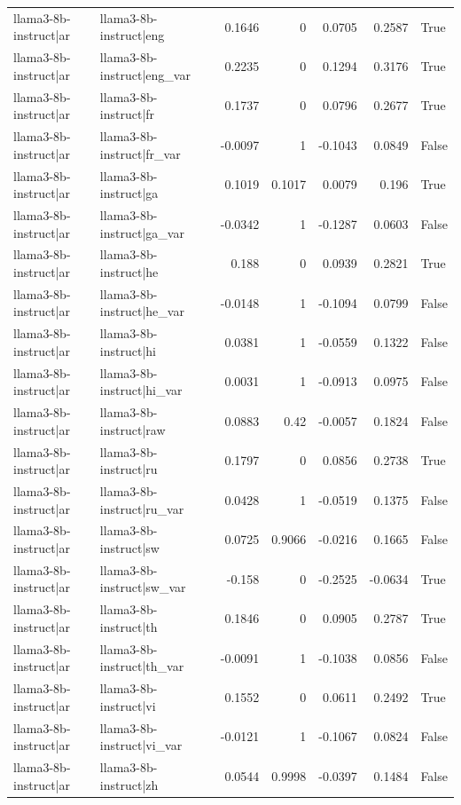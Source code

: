 \begin{table}
\begin{tabular}{l l r r r r l}
llama3-8b-instruct|ar & llama3-8b-instruct|eng & 0.1646 & 0 & 0.0705 & 0.2587 & True \\
llama3-8b-instruct|ar & llama3-8b-instruct|eng_var & 0.2235 & 0 & 0.1294 & 0.3176 & True \\
llama3-8b-instruct|ar & llama3-8b-instruct|fr & 0.1737 & 0 & 0.0796 & 0.2677 & True \\
llama3-8b-instruct|ar & llama3-8b-instruct|fr_var & -0.0097 & 1 & -0.1043 & 0.0849 & False \\
llama3-8b-instruct|ar & llama3-8b-instruct|ga & 0.1019 & 0.1017 & 0.0079 & 0.196 & True \\
llama3-8b-instruct|ar & llama3-8b-instruct|ga_var & -0.0342 & 1 & -0.1287 & 0.0603 & False \\
llama3-8b-instruct|ar & llama3-8b-instruct|he & 0.188 & 0 & 0.0939 & 0.2821 & True \\
llama3-8b-instruct|ar & llama3-8b-instruct|he_var & -0.0148 & 1 & -0.1094 & 0.0799 & False \\
llama3-8b-instruct|ar & llama3-8b-instruct|hi & 0.0381 & 1 & -0.0559 & 0.1322 & False \\
llama3-8b-instruct|ar & llama3-8b-instruct|hi_var & 0.0031 & 1 & -0.0913 & 0.0975 & False \\
llama3-8b-instruct|ar & llama3-8b-instruct|raw & 0.0883 & 0.42 & -0.0057 & 0.1824 & False \\
llama3-8b-instruct|ar & llama3-8b-instruct|ru & 0.1797 & 0 & 0.0856 & 0.2738 & True \\
llama3-8b-instruct|ar & llama3-8b-instruct|ru_var & 0.0428 & 1 & -0.0519 & 0.1375 & False \\
llama3-8b-instruct|ar & llama3-8b-instruct|sw & 0.0725 & 0.9066 & -0.0216 & 0.1665 & False \\
llama3-8b-instruct|ar & llama3-8b-instruct|sw_var & -0.158 & 0 & -0.2525 & -0.0634 & True \\
llama3-8b-instruct|ar & llama3-8b-instruct|th & 0.1846 & 0 & 0.0905 & 0.2787 & True \\
llama3-8b-instruct|ar & llama3-8b-instruct|th_var & -0.0091 & 1 & -0.1038 & 0.0856 & False \\
llama3-8b-instruct|ar & llama3-8b-instruct|vi & 0.1552 & 0 & 0.0611 & 0.2492 & True \\
llama3-8b-instruct|ar & llama3-8b-instruct|vi_var & -0.0121 & 1 & -0.1067 & 0.0824 & False \\
llama3-8b-instruct|ar & llama3-8b-instruct|zh & 0.0544 & 0.9998 & -0.0397 & 0.1484 & False \\

\end{tabular}
\end{table}
